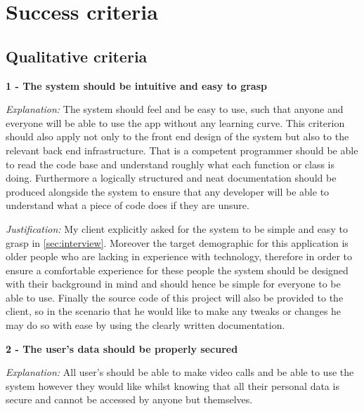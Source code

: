 \section{Success criteria}

\subsection{Qualitative criteria}

\textsf{\bfseries 1 - The system should be intuitive and easy to grasp}
\vspace{0.1cm}

\textit{Explanation:}
The system should feel and be easy to use, such that anyone
and everyone will be able to use the app without any learning
curve. This criterion should also apply not only to the front
end design of the system but also to the relevant back end
infrastructure. That is a competent programmer should be able to
read the code base and understand roughly what each function or
class is doing. Furthermore a logically structured and neat
documentation should be produced alongside the system to
ensure that any developer will be able to understand what
a piece of code does if they are unsure.

\vspace{0.1cm}

\textit{Justification:}
My client explicitly asked for the system to be simple and
easy to grasp in \ref{sec:interview}. Moreover the target
demographic for this application is older people who are
lacking in experience with technology, therefore in order to
ensure a comfortable experience for these people the system
should be designed with their background in mind and should
hence be simple for everyone to be able to use. Finally the
source code of this project will also be provided to the
client, so in the scenario that he would like to make any
tweaks or changes he may do so with ease by using the clearly
written documentation.

\vspace{0.2cm}

\textsf{\bfseries 2 - The user's data should be properly secured}

\vspace{0.1cm}

\textit{Explanation:}
All user's should be able to make video calls and be able to
use the system however they would like whilst knowing that all
their personal data is secure and cannot be accessed by anyone
but themselves.

